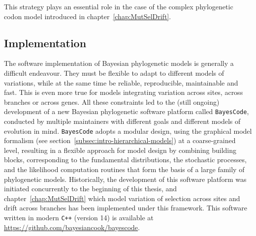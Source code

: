 This strategy plays an essential role in the case of the complex phylogenetic codon model introduced in chapter~\ref{chap:MutSelDrift}.

\subsection{Implementation}
\label{subsec:implementation}

The software implementation of Bayesian phylogenetic models is generally a difficult endeavour.
They must be flexible to adapt to different models of variations, while at the same time be reliable, reproducible, maintainable and fast.
This is even more true for models integrating variation across sites, across branches or across genes.
All these constraints led to the (still ongoing) development of a new Bayesian phylogenetic software platform called \texttt{BayesCode}, conducted by multiple maintainers with different goals and different models of evolution in mind.
\texttt{BayesCode} adopts a modular design, using the graphical model formalism (see section~\ref{subsec:intro-hierarchical-models}) at a coarse-grained level, resulting in a flexible approach for model design by combining building blocks, corresponding to the fundamental distributions, the stochastic processes, and the likelihood computation routines that form the basis of a large family of phylogenetic models.
Historically, the development of this software platform was initiated concurrently to the beginning of this thesis, and chapter~\ref{chap:MutSelDrift} which model variation of selection across sites and drift across branches has been implemented under this framework.
This software written in modern \texttt{C++} (version 14) is available at \url{https://github.com/bayesiancook/bayescode}.
